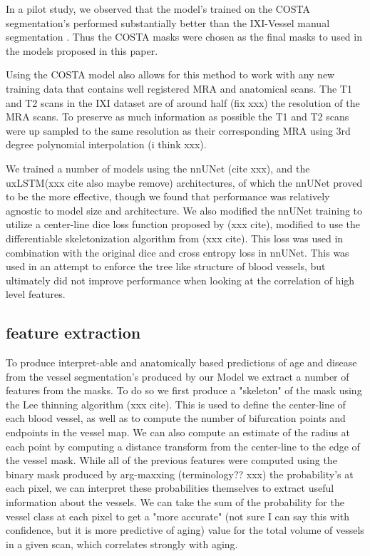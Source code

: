 \documentclass[pdflatex,sn-mathphys-num]{sn-jnl}
\begin{document}
In a pilot study, we observed that the model's trained on the COSTA segmentation's performed substantially better than the IXI-Vessel manual segmentation \cite{XXX}. Thus the COSTA masks were chosen as the final masks to used in the models proposed in this paper.

Using the COSTA model also allows for this method to work with any new training data that contains well registered MRA and anatomical scans. The T1 and T2 scans in the IXI dataset are of around half (fix xxx) the resolution of the MRA scans. To preserve as much information as possible the T1 and T2 scans were up sampled to the same resolution as their corresponding MRA using 3rd degree polynomial interpolation (i think xxx).


We trained a number of models using the nnUNet (cite xxx), and the uxLSTM(xxx cite also maybe remove) architectures, of which the nnUNet proved to be the more effective, though we found that performance was relatively agnostic to model size and architecture. We also modified the nnUNet training to utilize a center-line dice loss function proposed by (xxx cite), modified to use the differentiable skeletonization algorithm from (xxx cite). This loss was used in combination with the original dice and cross entropy loss in nnUNet. This was used in an attempt to enforce the tree like structure of blood vessels, but ultimately did not improve performance when looking at the correlation of high level features.

\subsection{feature extraction}

To produce interpret-able and anatomically based predictions of age and disease from the vessel segmentation's produced by our Model we extract a number of features from the masks. To do so we first produce a "skeleton" of the mask using the Lee thinning algorithm (xxx cite). This is used to define the center-line of each blood vessel, as well as to compute the number of bifurcation points and endpoints in the vessel map. We can also compute an estimate of the radius at each point by computing a distance transform from the center-line to the edge of the vessel mask. While all of the previous features were computed using the binary mask produced by arg-maxxing (terminology?? xxx) the probability's at each pixel, we can interpret these probabilities themselves to extract useful information about the vessels. We can take the sum of the probability for the vessel class at each pixel to get a "more accurate" (not sure I can say this with confidence, but it is more predictive of aging) value for the total volume of vessels in a given scan, which correlates strongly with aging.
\end{document}

